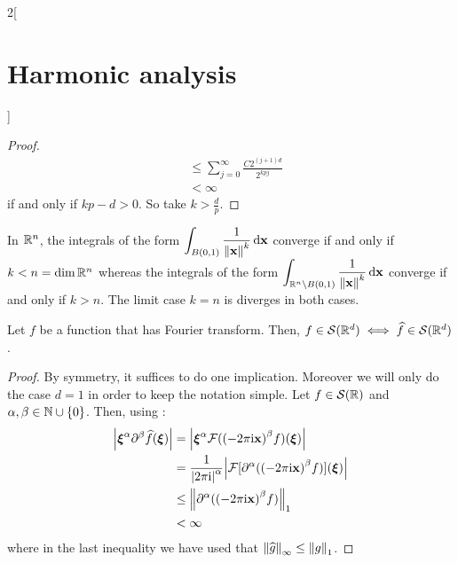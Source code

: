 \documentclass[../../../main_math.tex]{subfiles}
\begin{document}
\begin{multicols}{2}[\section{Harmonic analysis}]
\begin{proof}
\begin{align*}
                                                               & \leq\sum_{j=0}^\infty \frac{C2^{(j+1)d}}{2^{kpj}}             \\
                                                               & <\infty
    \end{align*}
    if and only if $kp-d>0$. So take $k> \frac{d}{p}$.
  \end{proof}
  \begin{remark}
    In $\mathbb{R}^n$, the integrals of the form $\displaystyle\int_{B(0,1)}\frac{1}{\left\|\boldsymbol{\mathrm{x}}\right\|^k}\dd{\boldsymbol{\mathrm{x}}}$ converge if and only if $k<n=\dim\mathbb{R}^n$ whereas the integrals of the form $\displaystyle\int_{\mathbb{R}^n\setminus B(0,1)}\frac{1}{\left\|\boldsymbol{\mathrm{x}}\right\|^k}\dd{\boldsymbol{\mathrm{x}}}$ converge if and only if $k>n$. The limit case $k=n$ is diverges in both cases.
  \end{remark}
  \begin{lemma}
    Let $f$ be a function that has Fourier transform. Then, $f\in \mathcal{S}(\mathbb{R}^d)\iff \widehat{f} \in \mathcal{S}(\mathbb{R}^d)$.
  \end{lemma}
  \begin{proof}
    By symmetry, it suffices to do one implication. Moreover we will only do the case $d=1$ in order to keep the notation simple. Let $f\in \mathcal{S}(\mathbb{R})$ and $\alpha,\beta\in\mathbb{N}\cup\{0\}$. Then, using :
    \begin{align*}
      \abs{\boldsymbol{\mathrm{\xi}}^\alpha\partial^\beta \widehat{f}(\boldsymbol{\mathrm{\xi}})} & =\abs{\boldsymbol{\mathrm{\xi}}^\alpha\mathcal{F}({(-2\pi\mathrm{i} \boldsymbol{\mathrm{x}})}^\beta f)(\boldsymbol{\mathrm{\xi}})}                                    \\
                                                            & =\frac{1}{\abs{2\pi\mathrm{i}}^\alpha}\abs{\mathcal{F}[\partial^\alpha ({(-2\pi\mathrm{i} \boldsymbol{\mathrm{x}})}^\beta f)](\boldsymbol{\mathrm{\xi}})} \\
                                                            & \leq \left\|\partial^\alpha ({(-2\pi\mathrm{i} \boldsymbol{\mathrm{x}})}^\beta f)\right\|_1                                    \\
                                                            & <\infty
    \end{align*}
    where in the last inequality we have used that $\left\|\widehat{g}\right\|_\infty\leq \left\|g\right\|_1$.
  \end{proof}

\end{multicols}
\end{document}
